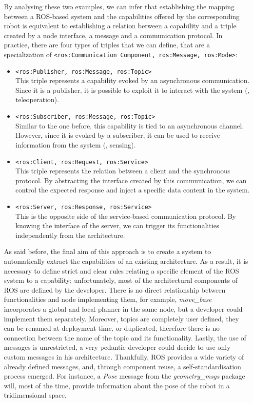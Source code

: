 By analysing these two examples, we can infer that establishing the mapping between a ROS-based system and the capabilities offered by the corresponding robot is equivalent to establishing a relation between a capability and a triple created by a node interface, a message and a communication protocol. In practice, there are four types of triples that we can define, that are a specialization of \texttt{<ros:Communication Component, ros:Message, ros:Mode>}:
\begin{itemize}
\item \texttt{<ros:Publisher, ros:Message, ros:Topic>} \\ This triple represents a capability evoked by an asynchronous communication. Since it is a publisher, it is possible to exploit it to interact with the system (\eg, teleoperation).
\item \texttt{<ros:Subscriber, ros:Message, ros:Topic>} \\ Similar to the one before, this capability is tied to an asynchronous channel. However, since it is evoked by a subscriber, it can be used to receive information from the system (\eg, sensing).
\item \texttt{<ros:Client, ros:Request, ros:Service>} \\ This triple represents the relation between a client and the synchronous protocol. By abstracting the interface created by this communication, we can control the expected response and inject a specific data content in the system.
\item \texttt{<ros:Server, ros:Response, ros:Service>} \\ This is the opposite side of the service-based communication protocol. By knowing the interface of the server, we can trigger its functionalities independently from the architecture.
\end{itemize}

As said before, the final aim of this approach is to create a system to automatically extract the capabilities of an existing architecture. As a result, it is necessary to define strict and clear rules relating a specific element of the ROS system to a capability; unfortunately, most of the architectural components of ROS are defined by the developer. There is no direct relationship between functionalities and node implementing them, for example, \textit{move\_base} incorporates a global and local planner in the same node, but a developer could implement them separately. Moreover, topics are completely user defined, they can be renamed at deployment time, or duplicated, therefore there is no connection between the name of the topic and its functionality. Lastly, the use of messages is unrestricted, a very pedantic developer could decide to use only custom messages in his architecture. Thankfully, ROS provides a wide variety of already defined messages, and, through component reuse, a self-standardisation process emerged. For instance, a \textit{Pose} message from the \textit{geometry\_msgs} package will, most of the time, provide information about the pose of the robot in a tridimensional space.

